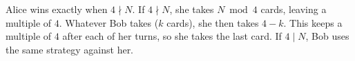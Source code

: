 Alice wins exactly when $\boxed{4\nmid N}$. If $4\nmid N$, she takes $N\bmod4$ cards, leaving a multiple of $4$. Whatever Bob takes ($k$ cards), she then takes $4-k$. This keeps a multiple of $4$ after each of her turns, so she takes the last card. If $4\mid N$, Bob uses the same strategy against her.
